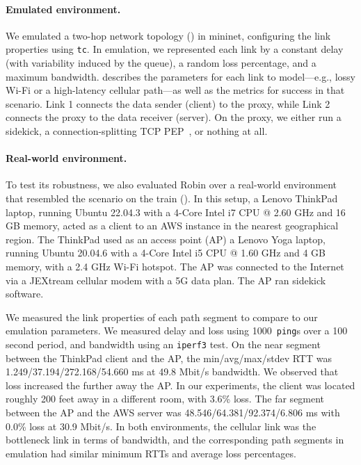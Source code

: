 \paragraph{Emulated environment.}
We emulated a two-hop network topology () in mininet,
configuring the link properties using \texttt{tc}.
In emulation, we represented
each link by a constant delay (with variability induced by the queue), a random
loss percentage, and a maximum bandwidth.
 describes the parameters
for each link to model---e.g., lossy Wi-Fi or a high-latency cellular
path---as well as the metrics for success in that scenario.
Link 1 connects the data sender (client) to the proxy,
while Link 2 connects the proxy to the data receiver (server).
On the proxy, we either run a sidekick,
a connection-splitting TCP PEP~\cite{caini2006pepsal}, or nothing at all.

\paragraph{Real-world environment.}
To test its robustness, we also evaluated Robin over a real-world
environment that resembled the scenario on the train ().
In this setup, a Lenovo ThinkPad laptop, running Ubuntu 22.04.3 with a 4-Core
Intel i7 CPU @ 2.60 GHz and 16 GB memory, acted as a client to an AWS instance in
the nearest geographical region. The ThinkPad used as an access point (AP)
a Lenovo Yoga laptop, running Ubuntu 20.04.6 with a 4-Core Intel i5 CPU @
1.60 GHz and 4 GB memory, with a 2.4 GHz Wi-Fi hotspot.
The AP was connected to the Internet via a JEXtream cellular modem
with a 5G data plan. The AP ran sidekick software.

We measured the link properties of each path segment to compare to
our emulation parameters. We measured delay and loss using 1000~\texttt{ping}s
over a 100 second period, and bandwidth using an \texttt{iperf3} test.
On the near segment between the ThinkPad client and the AP,
the min/avg/max/stdev RTT was 1.249/37.194/272.168/54.660 ms
at 49.8 Mbit/s bandwidth. We observed that loss increased
the further away the AP. In our experiments, the client was located roughly
200 feet away in a different room, with 3.6\% loss.
The far segment between the AP and the AWS server was
48.546/64.381/92.374/6.806 ms with 0.0\% loss at 30.9 Mbit/s.
In both environments, the cellular link was the bottleneck link in terms of
bandwidth, and the corresponding path segments in emulation had similar
minimum RTTs and average loss percentages.

